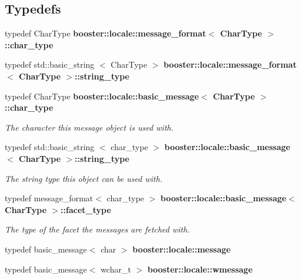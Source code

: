 \subsection*{\-Typedefs}
\begin{DoxyCompactItemize}
\item 
typedef \-Char\-Type {\bf booster\-::locale\-::message\-\_\-format$<$ Char\-Type $>$\-::char\-\_\-type}
\item 
typedef std\-::basic\-\_\-string\*
$<$ \-Char\-Type $>$ {\bf booster\-::locale\-::message\-\_\-format$<$ Char\-Type $>$\-::string\-\_\-type}
\item 
typedef \-Char\-Type {\bf booster\-::locale\-::basic\-\_\-message$<$ Char\-Type $>$\-::char\-\_\-type}\label{group__message_ga5cb546ceb92830ddf7ea2913e6651b9e}

\begin{DoxyCompactList}\small\item\em \-The character this message object is used with. \end{DoxyCompactList}\item 
typedef std\-::basic\-\_\-string\*
$<$ char\-\_\-type $>$ {\bf booster\-::locale\-::basic\-\_\-message$<$ Char\-Type $>$\-::string\-\_\-type}\label{group__message_ga90b2267af78f4df23fb621e3c1443707}

\begin{DoxyCompactList}\small\item\em \-The string type this object can be used with. \end{DoxyCompactList}\item 
typedef message\-\_\-format$<$ char\-\_\-type $>$ {\bf booster\-::locale\-::basic\-\_\-message$<$ Char\-Type $>$\-::facet\-\_\-type}\label{group__message_ga07188bff8c00be4a1b81323d45525b65}

\begin{DoxyCompactList}\small\item\em \-The type of the facet the messages are fetched with. \end{DoxyCompactList}\item 
typedef basic\-\_\-message$<$ char $>$ {\bf booster\-::locale\-::message}
\item 
typedef basic\-\_\-message$<$ wchar\-\_\-t $>$ {\bf booster\-::locale\-::wmessage}
\end{DoxyCompactItemize}
